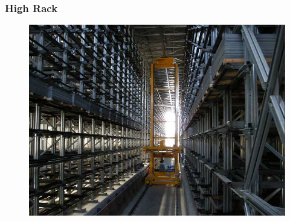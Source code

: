 \begin{frame}\frametitle{High Rack}
	\begin{figure}
		\includegraphics[height=.8\textheight]{images/ACP-ACM-StorageSystem}
	\end{figure}
\end{frame}


